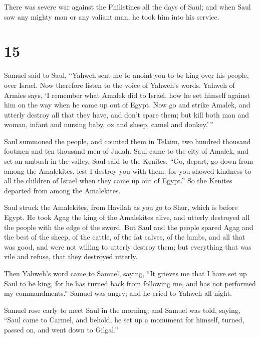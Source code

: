  There was severe war against the Philistines all the
days of Saul; and when Saul saw any mighty man or any valiant man, he
took him into his service.

\hypertarget{section-14}{%
\section{15}\label{section-14}}

 Samuel said to Saul, ``Yahweh sent me to anoint you to be
king over his people, over Israel. Now therefore listen to the voice of
Yahweh's words.  Yahweh of Armies says, `I remember what
Amalek did to Israel, how he set himself against him on the way when he
came up out of Egypt.  Now go and strike Amalek, and
utterly destroy all that they have, and don't spare them; but kill both
man and woman, infant and nursing baby, ox and sheep, camel and
donkey.'\,''

 Saul summoned the people, and counted them in Telaim, two
hundred thousand footmen and ten thousand men of Judah. 
Saul came to the city of Amalek, and set an ambush in the valley.
 Saul said to the Kenites, ``Go, depart, go down from
among the Amalekites, lest I destroy you with them; for you showed
kindness to all the children of Israel when they came up out of Egypt.''
So the Kenites departed from among the Amalekites.

 Saul struck the Amalekites, from Havilah as you go to
Shur, which is before Egypt.  He took Agag the king of the
Amalekites alive, and utterly destroyed all the people with the edge of
the sword.  But Saul and the people spared Agag and the
best of the sheep, of the cattle, of the fat calves, of the lambs, and
all that was good, and were not willing to utterly destroy them; but
everything that was vile and refuse, that they destroyed utterly.

 Then Yahweh's word came to Samuel, saying,
 ``It grieves me that I have set up Saul to be king, for
he has turned back from following me, and has not performed my
commandments.'' Samuel was angry; and he cried to Yahweh all night.

 Samuel rose early to meet Saul in the morning; and
Samuel was told, saying, ``Saul came to Carmel, and behold, he set up a
monument for himself, turned, passed on, and went down to Gilgal.''

